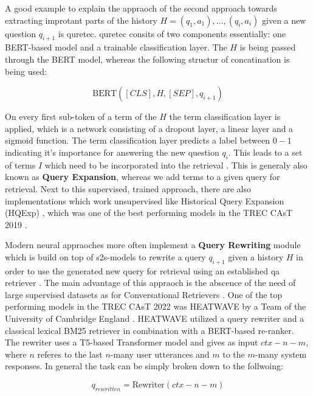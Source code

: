 A good example to explain the appraoch of the second approach towards extracting improtant parts of the history $H = {(q_1, a_1), \dots , (q_i, a_i)}$ given a new question $q_{i+1}$ is \gls{quretec}\cite{voskarides_query_2020}. \gls{quretec} consits of two components essentially: one BERT-based model and a trainable classification layer. The $H$ is being passed through the BERT model, whereas the following structur of concatination is being used: 

\begin{equation}
    \text{BERT}([CLS],H,[SEP],q_{i+1}) 
\end{equation}

On every first sub-token of a term of the $H$ the term classification layer is applied, which is a network consisting of a dropout layer, a linear layer and a sigmoid function. The term classification layer predicts a label between $0-1$ indicating it's importance for answering the new question $q_i$. This leads to a set of terms $I$ which need to be incorporated into the retrieval \cite{voskarides_query_2020}. This is generaly also known as \textbf{Query Expansion}, whereas we add terms to a given query for retrieval. Next to this supervised, trained approach, there are also implementations which work unsupervised like Historical Query Expansion (HQExp) \cite{yang_query_2019}, which was one of the best performing models in the TREC CAsT 2019 \cite{dalton_trec_2020}.

Modern neural appraoches more often implement a \textbf{Query Rewriting} module which is build on top of \gls{s2s}-models to rewrite a query $q_{i+1}$ given a history $H$ in order to use the generated new query for retrieval using an established \gls{qa} retriever \cite{owoicho_trec_2022}. The main advantage of this appraoch is the abscence of the need of large supervised datasets as for Conversational Retrievers \cite{dai_dialog_2022}. One of the top performing models in the TREC CAsT 2022 was HEATWAVE by a Team of the University of Cambridge England \cite{liusie_university_nodate}. HEATWAVE utilized a query rewriter and a classical lexical BM25 retriever in combination with a BERT-based re-ranker. The rewriter uses a T5-based Transformer model and gives as input $ctx-n-m$, where $n$ referes to the last $n$-many user utterances and $m$ to the $m$-many system responses. In general the task can be simply broken down to the follwoing:

\begin{equation}
    q_{rewritten} = \text{Rewriter}(ctx-n-m)
\end{equation}

